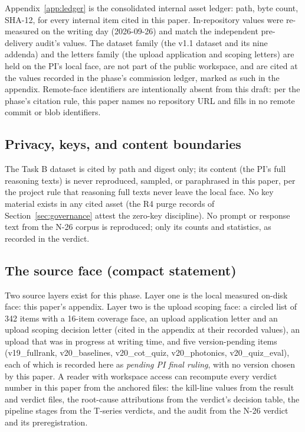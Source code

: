 \documentclass[11pt]{article}
\begin{document}
Appendix~\ref{app:ledger} is the consolidated internal asset ledger: path, byte count, SHA-12, for every internal item cited in this paper. In-repository values were re-measured on the writing day (2026-09-26) and match the independent pre-delivery audit's values. The dataset family (the v1.1 dataset and its nine addenda) and the letters family (the upload application and scoping letters) are held on the PI's local face, are not part of the public workspace, and are cited at the values recorded in the phase's commission ledger, marked as such in the appendix. Remote-face identifiers are intentionally absent from this draft: per the phase's citation rule, this paper names no repository URL and fills in no remote commit or blob identifiers.

\subsection{Privacy, keys, and content boundaries}

The Task B dataset is cited by path and digest only; its content (the PI's full reasoning texts) is never reproduced, sampled, or paraphrased in this paper, per the project rule that reasoning full texts never leave the local face. No key material exists in any cited asset (the R4 purge records of Section~\ref{sec:governance} attest the zero-key discipline). No prompt or response text from the N-26 corpus is reproduced; only its counts and statistics, as recorded in the verdict.

\subsection{The source face (compact statement)}

Two source layers exist for this phase. Layer one is the local measured on-disk face: this paper's appendix. Layer two is the upload scoping face: a circled list of 342 items with a 16-item coverage face, an upload application letter and an upload scoping decision letter (cited in the appendix at their recorded values), an upload that was in progress at writing time, and five version-pending items (v19\_fullrank, v20\_baselines, v20\_cot\_quiz, v20\_photonics, v20\_quiz\_eval), each of which is recorded here as \emph{pending PI final ruling}, with no version chosen by this paper. A reader with workspace access can recompute every verdict number in this paper from the anchored files: the kill-line values from the result and verdict files, the root-cause attributions from the verdict's decision table, the pipeline stages from the T-series verdicts, and the audit from the N-26 verdict and its preregistration.
\end{document}
